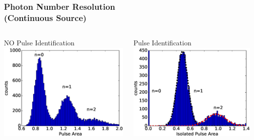 \begin{frame}\frametitle{Photon Number Resolution\\(Continuous Source)}
  \begin{center}
  \begin{columns}
        \begin{center}
        NO Pulse Identification
          \includegraphics[width=1\textwidth]{images/area_distribution/area_abs_histo.eps}
        \end{center}
        \begin{center}
        Pulse Identification
          \includegraphics[width=1\textwidth]{images/area_distribution/area_windowed_histo.eps}
        \end{center}
    \end{columns}
  \end{center}
\end{frame}